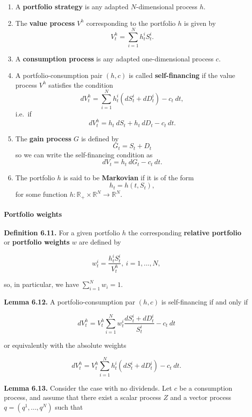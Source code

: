 \documentclass[
]{article}
\providecommand{\tightlist}{%
  \setlength{\itemsep}{0pt}\setlength{\parskip}{0pt}}
\begin{document}
\begin{enumerate}
\def\labelenumi{\arabic{enumi}.}
\tightlist
\item
  A \textbf{portfolio strategy} is any adapted \(N\)-dimensional process
  \(h\).
\item
  The \textbf{value process} \(V^h\) corresponding to the portfolio
  \(h\) is given by \[
    V_t^h=\sum_{i=1}^N h_t^iS_t^i.
    \]
\item
  A \textbf{consumption process} is any adapted one-dimensional process
  \(c\).
\item
  A portfolio-consumption pair \((h,c)\) is called
  \textbf{self-financing} if the value process \(V^h\) satisfies the
  condition \[
    dV_t^h=\sum_{i=1}^N h_t^i(dS_t^i+d D^i_t)-c_t\ dt,
    \] i.e.~if \[
    dV_t^h=h_t\ dS_t + h_t\ dD_t -c_t\ dt.
    \]
\item
  The \textbf{gain process} \(G\) is defined by \[
    G_t=S_t+D_t
    \] so we can write the self-financing condition as \[
    dV_t=h_t\ dG_t-c_t\ dt.
    \]
\item
  The portfolio \(h\) is said to be \textbf{Markovian} if it is of the
  form \[
    h_t=h(t,S_t),
    \] for some function
  \(h : \mathbb{R}_+\times \mathbb{R}^N\to\mathbb{R}^N\).
\end{enumerate}

\hypertarget{portfolio-weights}{%
\paragraph{Portfolio weights}\label{portfolio-weights}}

\textbf{Definition 6.11.} For a given portfolio \(h\) the corresponding
\textbf{relative portfolio} or \textbf{portfolio weights} \(w\) are
defined by

\[
w_t^i=\frac{h_t^iS_t^i}{V_t^h},\ i=1,...,N,
\]

so, in particular, we have \(\sum_{i=1}^N w_i=1\).

\textbf{Lemma 6.12.} A portfolio-consumption par \((h,c)\) is
self-financing if and only if

\[
dV_t^h=V_t^h\sum_{i=1}^N w_t^i\frac{dS_t^i+dD_t^i}{S_t^i}-c_t\ dt
\]

or equivalently with the absolute weights

\[
dV_t^h=V_t^h\sum_{i=1}^N h_t^i(dS_t^i+dD_t^i)-c_t\ dt.
\]

\textbf{Lemma 6.13.} Consider the case with no dividends. Let \(c\) be a
consumption process, and assume that there exist a scalar process \(Z\)
and a vector process \(q=(q^1,...,q^N)\) such that
\end{document}
